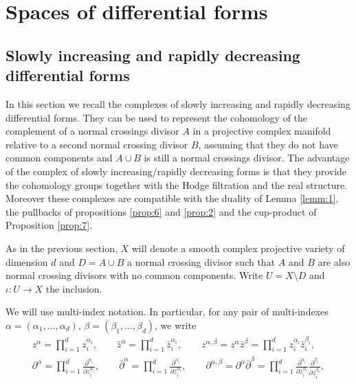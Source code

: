 \documentclass[11pt,a4paper]{amsart}
\numberwithin{equation}{section}
\theoremstyle{plain}
\theoremstyle{definition}
\begin{document}
\section{Spaces of differential forms}
\label{sec:spac-diff-forms}

\subsection{Slowly increasing and rapidly decreasing differential
  forms}
\label{sec:slowly-incr-rapidly}
In this section we recall the complexes of slowly increasing and
rapidly decreasing differential forms. They can be used to represent
the cohomology of the complement of a normal
crossings divisor $A$ in a projective complex manifold relative to a
second normal crossing divisor 
$B$, assuming that they do not have common components and $A\cup B$ is
still a normal crossings divisor. The advantage of the complex of
slowly increasing/rapidly decreasing forms is that they provide
the cohomology groups together with the Hodge filtration and the real
structure. Moreover these complexes are compatible with the duality of
Lemma \ref{lemm:1}, the pullbacks  of propositions \ref{prop:6} and
\ref{prop:2} and the cup-product of Proposition \ref{prop:7}.

As in the previous section, $X$ will denote a smooth complex
projective variety of dimension $d$ and 
$D=A\cup B$ a normal crossing divisor such that $A$ and $B$ 
are also normal crossing divisors with no common components. Write
$U=X\setminus D$ and $\iota\colon U\to X$ the inclusion. 

We will use multi-index notation. In particular,
for any pair of multi-indexes $\alpha =(\alpha _1,\dots,\alpha
_d)$, $\beta  =(\beta  _1,\dots,\beta 
_d)$, we write
\begin{gather*}
  z^{\alpha }=\prod_{i=1}^{d}z_{i}^{\alpha _{i}},\qquad \bar
  z^{\alpha}=\prod_{i=1}^{d}\bar z_{i}^{\alpha _{i}},\qquad
  z^{\alpha,\beta }=z^{\alpha }\bar z^{\beta }=\prod_{i=1}^{d}z_{i}^{\alpha _{i}}\bar z_{i}^{\beta
    _{i}},\\
  \partial^{\alpha }=\prod_{i=1}^{d}\frac{\partial^{\alpha _{i}}}{\partial z_{i}^{\alpha _{i}}},\qquad \bar
  \partial^{\alpha}=\prod_{i=1}^{d}\frac{\partial^{\alpha
      _{i}}}{\partial \bar z_{i}^{\alpha _{i}}},\qquad
  \partial^{\alpha,\beta }=\partial^{\alpha }\bar \partial^{\beta }=\prod_{i=1}^{d}
  \frac{\partial^{\alpha _{i}}}{\partial z_{i}^{\alpha _{i}}}
  \frac{\partial^{\beta _{i}}}{\partial \bar z_{i}^{\beta _{i}}},
\end{gather*}
\end{document}
